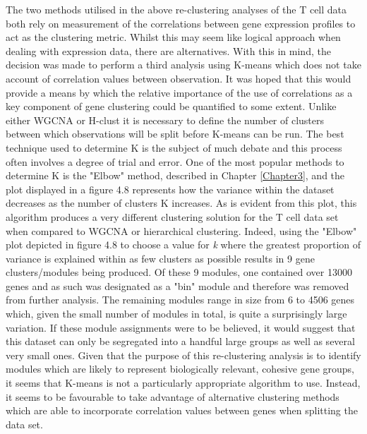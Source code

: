 The two methods utilised in the above re-clustering analyses of the T cell data both rely on measurement of the correlations between gene expression profiles to act as the clustering metric. Whilst this may seem like logical approach when dealing with expression data, there are alternatives. With this in mind, the decision was made to perform a third analysis using K-means which does not take account of correlation values between observation. It was hoped that this would provide a means by which the relative importance of the use of correlations as a key component of gene clustering could be quantified to some extent. Unlike either WGCNA or H-clust it is necessary to define the number of clusters between which observations will be split before K-means can be run. The best technique used to determine K is the subject of much debate and this process often involves a degree of trial and error. One of the most popular methods to determine K is the "Elbow" method, described in Chapter \ref{Chapter3}, and the plot displayed in a figure 4.8 represents how the variance within the dataset decreases as the number of clusters K increases. As is evident from this plot, this algorithm produces a very different clustering solution for the T cell data set when compared to WGCNA or hierarchical clustering. Indeed, using the "Elbow" plot depicted in figure 4.8 to choose a value for \textit{k} where the greatest proportion of variance is explained within as few clusters as possible results in 9 gene clusters/modules being produced. Of these 9 modules, one contained over 13000 genes and as such was designated as a "bin" module and therefore was removed from further analysis. The remaining modules range in size from 6 to 4506 genes which, given the small number of modules in total, is quite a surprisingly large variation. If these module assignments were to be believed, it would suggest that this dataset can only be segregated into a handful large groups as well as several very small ones. Given that the purpose of this re-clustering analysis is to identify modules which are likely to represent biologically relevant, cohesive gene groups, it seems that K-means is not a particularly appropriate algorithm to use. Instead, it seems to be favourable to take advantage of alternative clustering methods which are able to incorporate correlation values between genes when splitting the data set. 

